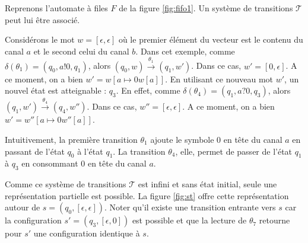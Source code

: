 \begin{example}

  Reprenons l'automate à files $F$ de la figure \ref{fig:fifo1}. Un système de transitions $\mathcal{T}$ peut lui être associé.

  Considérons le mot $w=[\epsilon,\epsilon]$ où le premier élément du vecteur est le contenu du canal $a$ et le second celui du canal $b$.
  Dans cet exemple, comme $\delta(\theta_1)=(q_0,a!0,q_1)$, alors $(q_0,w)\xrightarrow{\theta_1}(q_1,w')$. Dans ce cas, $w'=[0,\epsilon]$. A ce moment, on a bien $w'=w[a\mapsto 0w[a]]$.
  En utilisant ce nouveau mot $w'$, un nouvel état est atteignable : $q_3$. En effet, comme $\delta(\theta_4)=(q_1,a?0,q_3)$, alors $(q_1,w')\xrightarrow{\theta_4}(q_4,w'')$. Dans ce cas, $w''=[\epsilon,\epsilon]$. A ce moment, on a bien $w'=w''[a\mapsto 0w''[a]]$.

  Intuitivement, la première transition $\theta_1$ ajoute le symbole $0$ en tête du canal $a$ en passant de l'état $q_0$ à l'état $q_1$. La transition $\theta_4$, elle, permet de passer de l'état $q_1$ à $q_3$ en consommant $0$ en tête du canal $a$.


  Comme ce système de transitions $\mathcal{T}$ est infini et sans état initial, seule une représentation partielle est possible. La figure \ref{fig:st} offre cette représentation autour de $s=(q_0,[\epsilon,\epsilon])$. Noter qu'il existe une transition entrante vers $s$ car la configuration $s'=(q_3,[\epsilon, 0])$ est possible et que la lecture de $\theta_7$ retourne pour $s'$ une configuration identique à $s$.

  \begin{figure}[H]
    \centering
\end{figure}
\end{example}
